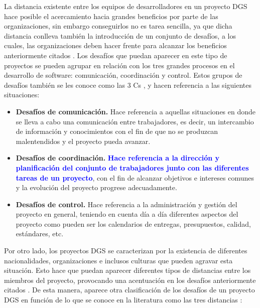 La distancia existente entre los equipos de desarrolladores en un proyecto DGS hace posible el acercamiento hacia grandes beneficios por parte de las organizaciones, sin embargo conseguirlos no es tarea sencilla, ya que dicha distancia conlleva también la introducción de un conjunto de desafíos, a los cuales, las organizaciones deben hacer frente para alcanzar los beneficios anteriormente citados \cite{conchuir2006exploring}. Los desafíos que puedan aparecer en este tipo de proyectos se pueden agrupar en relación con los tres grandes procesos en el desarrollo de software: comunicación, coordinación y control. Estos grupos de desafíos también se les conoce como las 3 Cs \cite{vizcaino2015vision, piattini2014desarrollo}, y hacen referencia a las siguientes situaciones:

\begin{itemize}
	\item \textbf{Desafíos de comunicación.} Hace referencia a aquellas situaciones en donde se lleva a cabo una comunicación entre trabajadores, es decir, un intercambio de información y conocimientos con el fin de que no se produzcan malentendidos y el proyecto pueda avanzar.
	\item \textbf{Desafíos de coordinación.} \textbf{\textcolor{blue}{Hace referencia a la dirección y planificación del conjunto de trabajadores junto con las diferentes tareas de un proyecto}}, con el fin de alcanzar objetivos e intereses comunes y la evolución del proyecto progrese adecuadamente.
	\item \textbf{Desafíos de control.} Hace referencia a la administración y gestión del proyecto en general, teniendo en cuenta día a día diferentes aspectos del proyecto como pueden ser los calendarios de entregas, presupuestos, calidad, estándares, etc. 
\end{itemize}

Por otro lado, los proyectos DGS se caracterizan por la existencia de diferentes nacionalidades, organizaciones e inclusos culturas que pueden agravar esta situación. Esto hace que puedan aparecer diferentes tipos de distancias entre los miembros del proyecto, provocando una acentuación en los desafíos anteriormente citados \cite{vizcaino2015vision}. De esta manera, aparece otra clasificación de los desafíos de un proyecto DGS en función de lo que se conoce en la literatura como las tres distancias \cite{vizcaino2015vision, conchuir2006exploring, conchuir2009global}:

